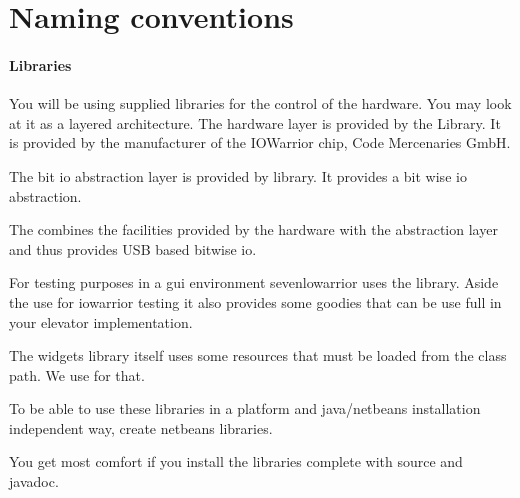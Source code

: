 \section{Naming conventions}
\paragraph{Libraries}
You will be using supplied libraries for the control of the
hardware. You may look at it as a layered architecture. The hardware
layer is provided by the  Library. It is provided by
the manufacturer of the IOWarrior chip, Code Mercenaries GmbH.

The bit io abstraction layer is provided by 
library. It provides a bit wise io abstraction.

The  combines the facilities provided by the
hardware with the abstraction layer and thus provides USB based
bitwise io. 

For testing purposes in a gui environment sevenlowarrior uses the
 library. Aside the use for iowarrior testing it
also provides some goodies that can be use full in your elevator
implementation.

The widgets library itself uses some resources that must be loaded
from the class path. We use  for that.

To be able to use these libraries in a platform and java/netbeans installation
independent way, create netbeans libraries.


You get most comfort if you install the libraries complete with source
and javadoc. 

